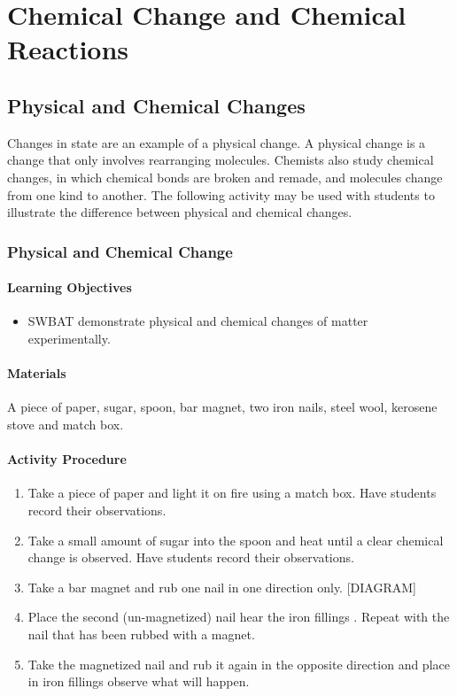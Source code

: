 \chapter{Chemical Change and Chemical Reactions}


\section{Physical and Chemical Changes}

Changes in state are an example of a physical change. A physical change is a change that only involves rearranging molecules. Chemists also study chemical changes, in which chemical bonds are broken and remade, and molecules change from one kind to another. The following activity may be used with students to illustrate the difference between physical and chemical changes.

\subsection{Physical and Chemical Change}

\subsubsection*{Learning Objectives}
\begin{itemize}
\item{SWBAT demonstrate physical and chemical changes of matter experimentally.}
\end{itemize}


\subsubsection*{Materials}
A piece of paper, sugar, spoon, bar magnet, two iron nails, steel wool, kerosene stove and match box.

\subsubsection*{Activity Procedure}
\begin{enumerate}
\item{Take a piece of paper and light it on fire using a match box. Have students record their observations.}
\item{Take a small amount of sugar into the spoon and heat until a clear chemical change is observed. Have students record their observations.}
\item{Take a bar magnet and rub one nail in one direction only. [DIAGRAM]}
\item{ Place the second (un-magnetized) nail hear the iron fillings . Repeat with the nail that has been rubbed with a magnet.}
\item{Take the magnetized nail and rub it again in the opposite direction and place in iron fillings observe what will happen.}
\end{enumerate}

